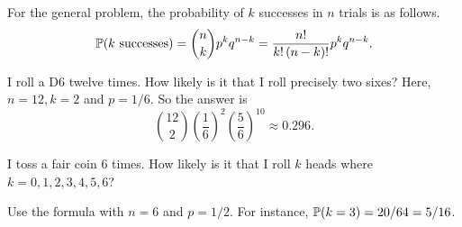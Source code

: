 For the general problem, the probability of $k$ successes in $n$ trials is as follows.    
  \[
       {\mathbb P}( \text{$k$ successes}) =  \binom nk p^k q^{n-k} =  \frac{n!}{k! \, (n-k)!} p^k q^{n-k}. 
  \]

\begin{example}
I roll a D6 twelve times.  How likely is it that I roll precisely two sixes?   Here, $n=12, k=2$ and $p=1/6$. So the answer is 
 \[
    \binom{12}2 \left(\frac{1}{6}\right)^2  \left(\frac{5}{6}\right)^{10}
     \approx 0.296.
 \]
\end{example}

\begin{exer}
I toss a fair coin 6 times.  How likely is it that I roll $k$ heads where $k=0,1,2,3,4,5,6$? 
\end{exer}
\begin{sol}
Use the formula with $n=6$ and $p=1/2$.  For instance, ${\mathbb P}(k=3) = 20/64 = 5/16$. 
\end{sol}

